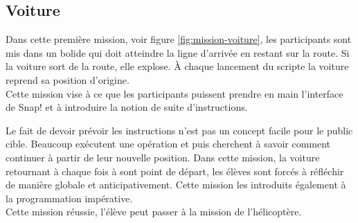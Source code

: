 % 

\subsection{Voiture}
\label{mission-voiture}
Dans cette première mission, voir figure \ref{fig:mission-voiture}, les participants sont mis dans un bolide qui doit atteindre la ligne d'arrivée en restant sur la route. Si la voiture sort de la route, elle explose. À chaque lancement du scripte la voiture reprend sa position d'origine.\\

Cette mission vise à ce que les participants puissent prendre en main l'interface de Snap! et à introduire la notion de suite d'instructions. 

Le fait de devoir prévoir les instructions n'est pas un concept facile pour le public cible. Beaucoup exécutent une opération et puis cherchent à savoir comment continuer à partir de leur nouvelle position. Dans cette mission, la voiture retournant à chaque fois à sont point de départ, les élèves sont forcés à réfléchir de manière globale et anticipativement. Cette mission les introduits également à la programmation impérative.\\ 

Cette mission réussie, l'élève peut passer à la mission de l'hélicoptère.

